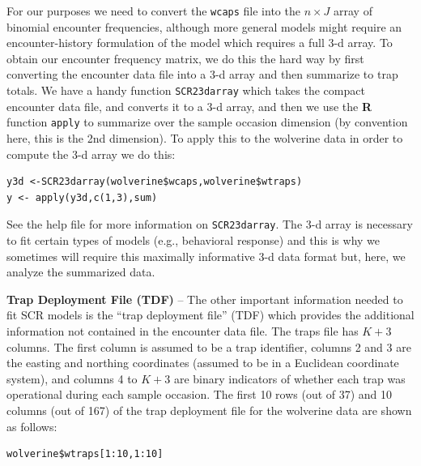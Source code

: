 {For our purposes we need to convert the \mbox{\tt wcaps} file into the
 $n \times J$ array of
binomial encounter frequencies, although more general models might
require an encounter-history formulation of the model which requires a
full 3-d array.  To obtain our encounter frequency matrix, we do this
the hard way by first converting the encounter data file into a 3-d
array and then summarize to trap totals. We have a handy function
\mbox{\tt SCR23darray} which takes the compact encounter data file,
and
converts it to a 3-d array, and then we use the {\bf R} function
\mbox{\tt apply} to summarize over the sample occasion dimension (by
convention here, this is the 2nd dimension). To apply this to the
wolverine data in order to compute the 3-d array we do this: 
{\small
\begin{verbatim}
y3d <-SCR23darray(wolverine$wcaps,wolverine$wtraps)
y <- apply(y3d,c(1,3),sum)
\end{verbatim} }
See the help file for more information on \mbox{\tt SCR23darray}.
The 3-d array is necessary to fit certain types of models (e.g.,
behavioral response) and this is why we sometimes will require this
maximally informative 3-d data format but, here, we analyze the
summarized data.


{\flushleft \bf Trap Deployment File (TDF)} --
The other important information needed to fit SCR models is the ``trap
deployment file'' (TDF)  which provides the additional information not
contained in the encounter data file. The traps file has $K + 3$ columns. The first column is assumed to be a trap
identifier, columns 2 and 3 are the easting and northing coordinates
(assumed to be in a Euclidean coordinate system), and columns 4 to
$K + 3$ are binary indicators of whether each trap
was operational during each sample occasion. The first 10 rows (out of 37) and
10 columns (out of 167) of the trap deployment file for the wolverine
data are shown as follows:
{\small
\begin{verbatim}
wolverine$wtraps[1:10,1:10]


\end{verbatim}}}
